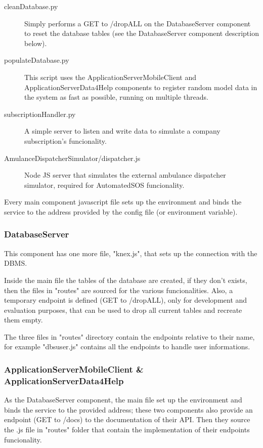 \documentclass[../main.tex]{subfiles}
\begin{document}
\begin{description}
	\item[cleanDatabase.py] Simply performs a GET to /dropALL on the DatabaseServer component to reset the database tables (see the DatabaseServer component description below).
	\item[populateDatabase.py] This script uses the ApplicationServerMobileClient and ApplicationServerData4Help components to register random model data in the system as fast as possible, running on multiple threads.
	\item[subscriptionHandler.py] A simple server to listen and write data to simulate a company subscription's funcionality.
	\item[AmulanceDispatcherSimulator/dispatcher.js] Node JS server that simulates the external ambulance dispatcher simulator, required for AutomatedSOS funcionality.
\end{description}

Every main component javascript file sets up the environment and binds the service to the address provided by the config file (or environment variable).

\subsubsection{DatabaseServer}

This component has one more file, "knex.js", that sets up the connection with the DBMS.

Inside the main file the tables of the database are created, if they don't exists, then the files in "routes" are sourced for the various funcionalities. Also, a temporary endpoint is defined (GET to /dropALL), only for development and evaluation purposes, that can be used to drop all current tables and recreate them empty.

The three files in "routes" directory contain the endpoints relative to their name, for example "dbs\textunderscore user.js" contains all the endpoints to handle user informations.

\subsubsection{ApplicationServerMobileClient \& ApplicationServerData4Help}

As the DatabaseServer component, the main file set up the environment and binds the service to the provided address; these two components also provide an endpoint (GET to /docs) to the documentation of their API. Then they source the .js file in "routes" folder that contain the implementation of their endpoints funcionality.
\end{document}
